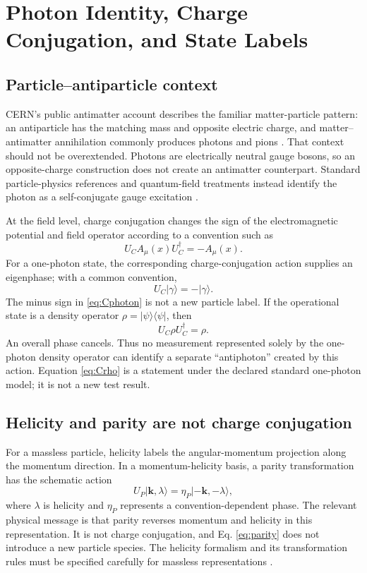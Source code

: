 \documentclass[conference]{../../../../Conference-LaTeX-template_10-17-19/IEEEtran}
\begin{document}
\section{Photon Identity, Charge Conjugation, and State Labels}
\subsection{Particle--antiparticle context}
CERN’s public antimatter account describes the familiar matter-particle pattern: an antiparticle has the matching mass and opposite electric charge, and matter--antimatter annihilation commonly produces photons and pions \cite{cern_antimatter_page}. That context should not be overextended. Photons are electrically neutral gauge bosons, so an opposite-charge construction does not create an antimatter counterpart. Standard particle-physics references and quantum-field treatments instead identify the photon as a self-conjugate gauge excitation \cite{pdg2022,weinberg_qft1}.

At the field level, charge conjugation changes the sign of the electromagnetic potential and field operator according to a convention such as
\begin{equation}
U_C A_\mu(x)U_C^\dagger=-A_\mu(x).
\label{eq:Cfield}
\end{equation}
For a one-photon state, the corresponding charge-conjugation action supplies an eigenphase; with a common convention,
\begin{equation}
U_C\lvert\gamma\rangle=-\lvert\gamma\rangle.
\label{eq:Cphoton}
\end{equation}
The minus sign in \eqref{eq:Cphoton} is not a new particle label. If the operational state is a density operator $\rho=\lvert\psi\rangle\langle\psi\rvert$, then
\begin{equation}
U_C\rho U_C^\dagger=\rho.
\label{eq:Crho}
\end{equation}
An overall phase cancels. Thus no measurement represented solely by the one-photon density operator can identify a separate ``antiphoton'' created by this action. Equation \eqref{eq:Crho} is a statement under the declared standard one-photon model; it is not a new test result.

\subsection{Helicity and parity are not charge conjugation}
For a massless particle, helicity labels the angular-momentum projection along the momentum direction. In a momentum-helicity basis, a parity transformation has the schematic action
\begin{equation}
U_P\lvert\mathbf{k},\lambda\rangle
=\eta_P\lvert-\mathbf{k},-\lambda\rangle,
\label{eq:parity}
\end{equation}
where $\lambda$ is helicity and $\eta_P$ represents a convention-dependent phase. The relevant physical message is that parity reverses momentum and helicity in this representation. It is not charge conjugation, and Eq. \eqref{eq:parity} does not introduce a new particle species. The helicity formalism and its transformation rules must be specified carefully for massless representations \cite{wigner1939,jacob_wick1959,weinberg_qft1}.
\end{document}
